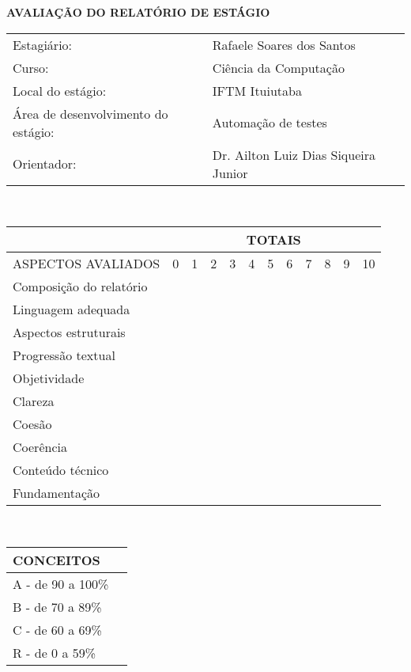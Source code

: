 \newpage
\begin{center}
\textbf{AVALIAÇÃO DO RELATÓRIO DE ESTÁGIO\\}
\end{center}

\begin{table}[h]
	\begin{tabular}{|ll|}
	\hline
	Estagiário: & Rafaele Soares dos Santos \\
	Curso: & Ciência da Computação \\
	Local do estágio: & IFTM Ituiutaba \\
	Área de desenvolvimento do estágio: & Automação de testes \\
	Orientador: & Dr. Ailton Luiz Dias Siqueira Junior \\
	\hline
\end{tabular}\\
\end{table}

\begin{table}[h]
	\begin{tabular}{|l|c|c|c|c|c|c|c|c|c|c|c|}
	\hline
	 & \multicolumn{11}{|c|}{TOTAIS} \\
	\hline
	ASPECTOS AVALIADOS & 0 & 1 & 2 & 3 & 4 & 5 & 6 & 7 & 8 & 9 & 10 \\
	\hline
	Composição do relatório & & & & & & & & & & & \\
	\hline
	Linguagem adequada & & & & & & & & & & & \\
	\hline
	Aspectos estruturais & & & & & & & & & & & \\
	\hline
	Progressão textual & & & & & & & & & & & \\
	\hline
	Objetividade & & & & & & & & & & & \\
	\hline
	Clareza & & & & & & & & & & & \\
	\hline
	Coesão & & & & & & & & & & & \\
	\hline
	Coerência & & & & & & & & & & & \\
	\hline
	Conteúdo técnico & & & & & & & & & & & \\
	\hline
	Fundamentação & & & & & & & & & & & \\
	\hline
\end{tabular}\\
\end{table}

\begin{table}[h]
	\begin{tabular}{|l|l|}
	\hline
	CONCEITOS \\
	\hline
	A - de 90 a 100\% \\
	\hline
	B - de 70 a 89\% \\
	\hline
	C - de 60 a 69\% \\
	\hline
	R - de 0 a 59\% \\
	\hline
\end{tabular}\\
\end{table}


